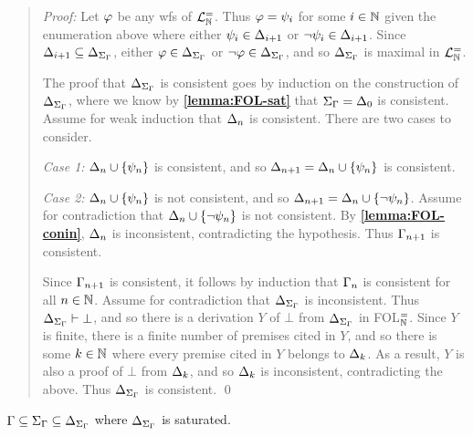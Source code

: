 \begin{quote} 
  \textit{Proof:} 
  Let $\varphi$ be any wfs of $\mathcal{L}^{=}_{\mathbb{N}}$.
  Thus $\varphi=\psi_i$ for some $i\in\mathbb{N}$ given the enumeration above where either $\psi_i\in\Delta_{i+1}$ or $\neg\psi_i\in\Delta_{i+1}$.
  Since $\Delta_{i+1}\subseteq\Delta_{\Sigma_{\Gamma}}$, either $\varphi\in\Delta_{\Sigma_{\Gamma}}$ or $\neg\varphi\in\Delta_{\Sigma_{\Gamma}}$, and so $\Delta_{\Sigma_{\Gamma}}$ is maximal in $\mathcal{L}^{=}_{\mathbb{N}}$.

  The proof that $\Delta_{\Sigma_{\Gamma}}$ is consistent goes by induction on the construction of $\Delta_{\Sigma_{\Gamma}}$, where we know by \textbf{\ref{lemma:FOL-sat}} that $\Sigma_{\Gamma}=\Delta_0$ is consistent. 
  Assume for weak induction that $\Delta_n$ is consistent. 
  There are two cases to consider.

  \textit{Case 1:} $\Delta_n\cup\lbrace\psi_n\rbrace$ is consistent, and so $\Delta_{n+1}=\Delta_n\cup\lbrace\psi_n\rbrace$ is consistent. 

  \textit{Case 2:} $\Delta_n\cup\lbrace\psi_n\rbrace$ is not consistent, and so $\Delta_{n+1}=\Delta_n\cup\lbrace\neg\psi_n\rbrace$. 
  Assume for contradiction that $\Delta_n\cup\lbrace\neg\psi_n\rbrace$ is not consistent. 
  By \textbf{\ref{lemma:FOL-conin}}, $\Delta_n$ is inconsistent, contradicting the hypothesis. 
  Thus $\Gamma_{n+1}$ is consistent. 

  Since $\Gamma_{n+1}$ is consistent, it follows by induction that $\Gamma_n$ is consistent for all $n\in\mathbb{N}$.
  Assume for contradiction that $\Delta_{\Sigma_{\Gamma}}$ is inconsistent.
  Thus $\Delta_{\Sigma_{\Gamma}}\vdash \bot$, and so there is a derivation $Y$ of $\bot$ from $\Delta_{\Sigma_{\Gamma}}$ in FOL$^=_{\mathbb{N}}$. 
  Since $Y$ is finite, there is a finite number of premises cited in $Y$, and so there is some $k\in\mathbb{N}$ where every premise cited in $Y$ belongs to $\Delta_k$.
  As a result, $Y$ is also a proof of $\bot$ from $\Delta_k$, and so $\Delta_k$ is inconsistent, contradicting the above. 
  Thus $\Delta_{\Sigma_{\Gamma}}$ is consistent. 
  \qed
\end{quote}




\begin{Lthm} \label{lemma:FOL-include}
  $\Gamma\subseteq\Sigma_{\Gamma}\subseteq\Delta_{\Sigma_{\Gamma}}$ where $\Delta_{\Sigma_{\Gamma}}$ is saturated.
\end{Lthm}
 
